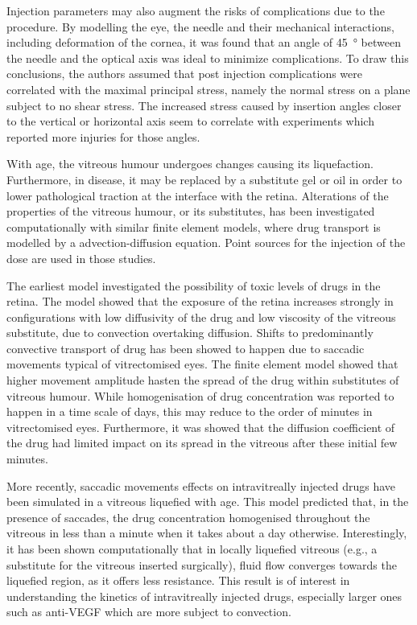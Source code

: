 \documentclass{article}
\begin{document}
Injection parameters may also augment the risks of complications due to the procedure.
By modelling the eye, the needle and their mechanical interactions, including deformation of the cornea, it was found that an angle of \SI{45}{\degree} between the needle and the optical axis was ideal to minimize complications.\cite{Karimi_2018}
To draw this conclusions, the authors assumed that post injection complications were correlated with the maximal principal stress, namely the normal stress on a plane subject to no shear stress.  
The increased stress caused by insertion angles closer to the vertical or horizontal axis seem to correlate with experiments which reported more injuries for those angles.\cite{Karimi_2018}

With age, the vitreous humour undergoes changes causing its liquefaction.
Furthermore, in disease, it may be replaced by a substitute gel or oil in order to lower pathological traction at the interface with the retina.
Alterations of the properties of the vitreous humour, or its substitutes, has been investigated computationally with similar finite element models, where drug transport is modelled by a advection-diffusion equation.\cite{Kathawate_2008,Modareszadeh_2012}
Point sources for the injection of the dose are used in those studies.

The earliest model investigated the possibility of toxic levels of drugs in the retina.\cite{Kathawate_2008}
The model showed that the exposure of the retina increases strongly in configurations with low diffusivity of the drug and low viscosity of the vitreous substitute, due to convection overtaking diffusion.\cite{Kathawate_2008}
Shifts to predominantly convective transport of drug has been showed to happen due to saccadic movements typical of vitrectomised eyes.\cite{Modareszadeh_2012}
The finite element model showed that higher movement amplitude hasten the spread of the drug within substitutes of vitreous humour.
While homogenisation of drug concentration was reported to happen in a time scale of days, this may reduce to the order of minutes in vitrectomised eyes.\cite{Modareszadeh_2012}
Furthermore, it was showed that the diffusion coefficient of the drug had limited impact on its spread in the vitreous after these initial few minutes.\cite{Modareszadeh_2012}

More recently, saccadic movements effects on intravitreally injected drugs have been simulated in a vitreous liquefied with age.\cite{Ferroni_2020}
This model predicted that, in the presence of saccades, the drug concentration homogenised throughout the vitreous in less than a minute when it takes about a day otherwise.
Interestingly, it has been shown computationally that in locally liquefied vitreous (e.g., a substitute for the vitreous inserted surgically), fluid flow converges towards the liquefied region, as it offers less resistance.\cite{Khoobyar_2022}
This result is of interest in understanding the kinetics of intravitreally injected drugs, especially larger ones such as anti-VEGF which are more subject to convection.
\end{document}
